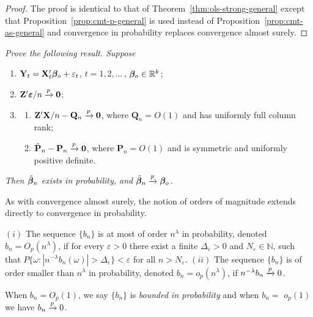 \begin{proof}
The proof is identical to that of Theorem~\ref{thm:ols-strong-general} except that Proposition~\ref{prop:cmt-p-general} is used instead of Proposition~\ref{prop:cmt-as-general} and convergence in probability
replaces convergence almost surely.
\end{proof}

\begin{exercises}
\item\label{ex:2.32} \emph{Prove the following result. Suppose}
\begin{enumerate}[label=$(\roman*)$]
\item $\mathbf{Y}_t = \mathbf{X}_t'\boldsymbol{\beta}_o + \varepsilon_t$, \quad $t = 1, 2, \ldots$\,, $\boldsymbol{\beta}_o \in \mathbb{R}^k$;
\item $\mathbf{Z}'\boldsymbol{\varepsilon}/n \xrightarrow{p} \mathbf{0}$;
\item[\emph{(iii)}] \begin{enumerate}[label=$(\alph*)$]
\item $\mathbf{Z}'\mathbf{X}/n - \mathbf{Q}_n \xrightarrow{p} \mathbf{0}$, where $\mathbf{Q}_n = O(1)$ and has uniformly full
column rank;
\item $\hat{\mathbf{P}}_n - \mathbf{P}_n \xrightarrow{p} \mathbf{0}$, where $\mathbf{P}_n = O(1)$ and is symmetric and uniformly
positive definite.
\end{enumerate}
\end{enumerate}
\emph{Then $\tilde{\boldsymbol{\beta}}_n$ exists in probability, and $\tilde{\boldsymbol{\beta}}_n \xrightarrow{p} \boldsymbol{\beta}_o$.}
\end{exercises}

As with convergence almost surely, the notion of orders of magnitude
extends directly to convergence in probability.

\begin{definition}\label{def:Op-op}
$(i)$ The sequence $\{b_n\}$ is at most of order $n^{\lambda}$ in probability, denoted $b_n = O_p(n^{\lambda})$, if for every $\varepsilon > 0$ there exist a finite $\Delta_{\varepsilon} > 0$
and $N_{\varepsilon} \in \mathbb{N}$, such that $P\{\omega : |n^{-\lambda}b_n(\omega)| > \Delta_{\varepsilon}\} < \varepsilon$ for all $n > N_{\varepsilon}$.
$(ii)$ The sequence $\{b_n\}$ is of order smaller than $n^{\lambda}$ in probability, denoted
$b_n = o_p(n^{\lambda})$, if $n^{-\lambda}b_n \xrightarrow{p} 0$.
\end{definition}

When $b_n = O_p(1)$, we say $\{b_n\}$ is \emph{bounded in probability} and when $b_n =$
$o_p(1)$ we have $b_n \xrightarrow{p} 0$.


